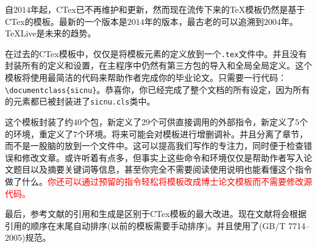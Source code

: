 \begin{ChineseAbstract}
    自$2014$年起，CTex已不再维护和更新，然而现在流传下来的TeX模板仍然是基于CTex的模板。最新的一个版本是$2014$年的版本，最古老的可以追溯到$2004$年。TeXLive是未来的趋势。
    
    在过去的CTex模板中，仅仅是将模板元素的定义放到一个\verb|.tex|文件中。并且没有封装所有的定义和设置，在主程序中仍然有第三方包的导入和全局全局定义。这个模板将使用最简洁的代码来帮助作者完成你的毕业论文。只需要一行代码：\verb|\documentclass{sicnu}|。恭喜你，你已经完成了整个文档的所有设定，因为所有的元素都已被封装进了\verb|sicnu.cls|类中。

    这个模板封装了约$40$个包，新定义了$29$个可供直接调用的外部指令，新定义了$5$个的环境，重定义了$7$个环境。将来可能会对模板进行增删调补。并且分离了章节，而不是一股脑的放到一个文件中。这可以提高我们写作的专注力，同时便于检查错误和修改文章。或许听着有点多，但事实上这些命令和环境仅仅是帮助作者写入论文题目以及摘要关键词等信息，甚至你完全不需要阅读使用说明也能看懂这个指令做了什么。\textcolor{red}{你还可以通过预留的指令轻松将模板改成博士论文模板而不需要修改源代码。}

    最后，参考文献的引用和生成是区别于CTex模板的最大改进。现在文献将会根据引用的顺序在末尾自动排序(以前的模板需要手动排序)。并且使用了(GB/T 7714--2005)规范。

\end{ChineseAbstract}

